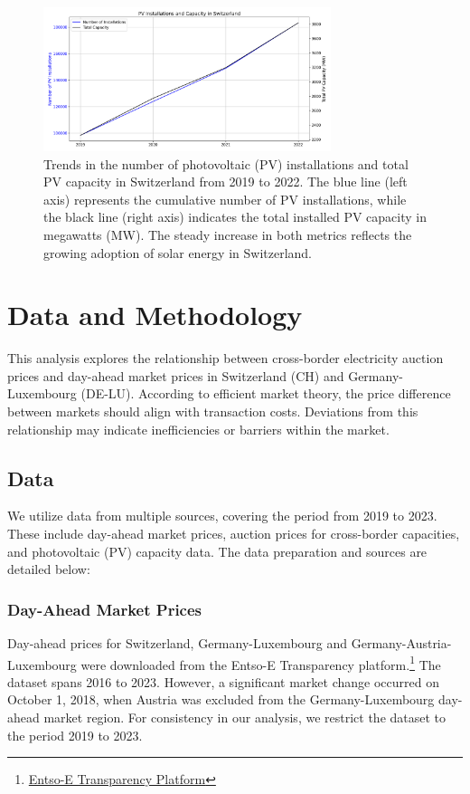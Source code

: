 \documentclass[12pt]{article}
\begin{document}
\begin{figure}[ht]
    \centering
    \includegraphics[width=0.75\textwidth]{figures/pv_installations_switzerland.png}
    \caption{Trends in the number of photovoltaic (PV) installations and total PV capacity in Switzerland from 2019 to 2022. The blue line (left axis) represents the cumulative number of PV installations, while the black line (right axis) indicates the total installed PV capacity in megawatts (MW). The steady increase in both metrics reflects the growing adoption of solar energy in Switzerland.}
    \label{fig:pv_increase}
\end{figure}

\section{Data and Methodology}

This analysis explores the relationship between cross-border electricity auction prices and day-ahead market prices in Switzerland (CH) and Germany-Luxembourg (DE-LU). According to efficient market theory, the price difference between markets should align with transaction costs. Deviations from this relationship may indicate inefficiencies or barriers within the market.

\subsection{Data}

We utilize data from multiple sources, covering the period from 2019 to 2023. These include day-ahead market prices, auction prices for cross-border capacities, and photovoltaic (PV) capacity data. The data preparation and sources are detailed below:

\subsubsection*{Day-Ahead Market Prices}

Day-ahead prices for Switzerland, Germany-Luxembourg and Germany-Austria-Luxembourg were downloaded from the Entso-E Transparency platform.\footnote{\href{https://transparency.entsoe.eu/}{Entso-E Transparency Platform}} The dataset spans 2016 to 2023. However, a significant market change occurred on October 1, 2018, when Austria was excluded from the Germany-Luxembourg day-ahead market region. For consistency in our analysis, we restrict the dataset to the period 2019 to 2023.
\end{document}
